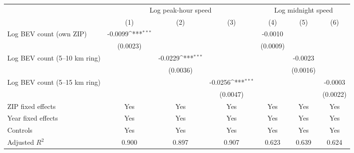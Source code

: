 {
\def\sym#1{\ifmmode^{#1}\else\(^{#1}\)\fi}
\begin{tabular}{l*{6}{c}}
\hline\hline
                    &\multicolumn{3}{c}{Log peak-hour speed}                          &\multicolumn{3}{c}{Log midnight speed}                           \\\cmidrule(lr){2-4}\cmidrule(lr){5-7}
                    &\multicolumn{1}{c}{(1)}         &\multicolumn{1}{c}{(2)}         &\multicolumn{1}{c}{(3)}         &\multicolumn{1}{c}{(4)}         &\multicolumn{1}{c}{(5)}         &\multicolumn{1}{c}{(6)}         \\
\hline
Log BEV count (own ZIP)&     -0.0099\sym{***}&                     &                     &     -0.0010         &                     &                     \\
                    &    (0.0023)         &                     &                     &    (0.0009)         &                     &                     \\
[1em]
Log BEV count (5--10 km ring)&                     &     -0.0229\sym{***}&                     &                     &     -0.0023         &                     \\
                    &                     &    (0.0036)         &                     &                     &    (0.0016)         &                     \\
[1em]
Log BEV count (5--15 km ring)&                     &                     &     -0.0256\sym{***}&                     &                     &     -0.0003         \\
                    &                     &                     &    (0.0047)         &                     &                     &    (0.0022)         \\
\hline
ZIP fixed effects   &         Yes         &         Yes         &         Yes         &         Yes         &         Yes         &         Yes         \\
Year fixed effects  &         Yes         &         Yes         &         Yes         &         Yes         &         Yes         &         Yes         \\
Controls            &         Yes         &         Yes         &         Yes         &         Yes         &         Yes         &         Yes         \\
Adjusted \(R^2\)    &       0.900         &       0.897         &       0.907         &       0.623         &       0.639         &       0.624         \\

\end{tabular}}
